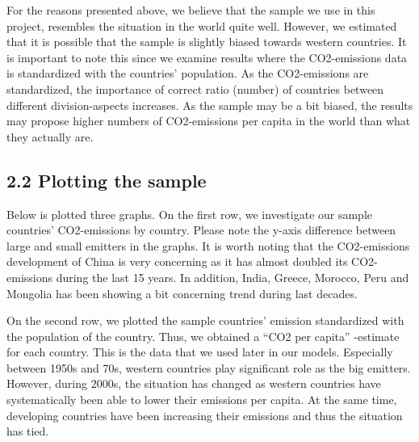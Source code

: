 \documentclass[
]{article}
\begin{document}
For the reasons presented above, we believe that the sample we use in
this project, resembles the situation in the world quite well. However,
we estimated that it is possible that the sample is slightly biased
towards western countries. It is important to note this since we examine
results where the CO2-emissions data is standardized with the countries'
population. As the CO2-emissions are standardized, the importance of
correct ratio (number) of countries between different division-aspects
increases. As the sample may be a bit biased, the results may propose
higher numbers of CO2-emissions per capita in the world than what they
actually are.

\hypertarget{plotting-the-sample}{%
\subsection{2.2 Plotting the sample}\label{plotting-the-sample}}

Below is plotted three graphs. On the first row, we investigate our
sample countries' CO2-emissions by country. Please note the y-axis
difference between large and small emitters in the graphs. It is worth
noting that the CO2-emissions development of China is very concerning as
it has almost doubled its CO2-emissions during the last 15 years. In
addition, India, Greece, Morocco, Peru and Mongolia has been showing a
bit concerning trend during last decades.

On the second row, we plotted the sample countries' emission
standardized with the population of the country. Thus, we obtained a
``CO2 per capita'' -estimate for each country. This is the data that we
used later in our models. Especially between 1950s and 70s, western
countries play significant role as the big emitters. However, during
2000s, the situation has changed as western countries have
systematically been able to lower their emissions per capita. At the
same time, developing countries have been increasing their emissions and
thus the situation has tied.
\end{document}
